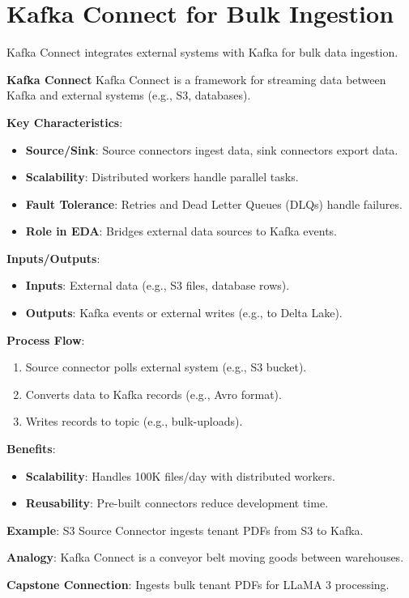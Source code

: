 \documentclass[11pt]{article}
\begin{document}
\section{Kafka Connect for Bulk Ingestion}
Kafka Connect integrates external systems with Kafka for bulk data ingestion.

\begin{glossaryterm}
\textbf{Kafka Connect}\newline
Kafka Connect is a framework for streaming data between Kafka and external systems (e.g., S3, databases).

\textbf{Key Characteristics}:
\begin{itemize}
    \item \textbf{Source/Sink}: Source connectors ingest data, sink connectors export data.
    \item \textbf{Scalability}: Distributed workers handle parallel tasks.
    \item \textbf{Fault Tolerance}: Retries and Dead Letter Queues (DLQs) handle failures.
    \item \textbf{Role in EDA}: Bridges external data sources to Kafka events.
\end{itemize}

\textbf{Inputs/Outputs}:
\begin{itemize}
    \item \textbf{Inputs}: External data (e.g., S3 files, database rows).
    \item \textbf{Outputs}: Kafka events or external writes (e.g., to Delta Lake).
\end{itemize}

\textbf{Process Flow}:
\begin{enumerate}
    \item Source connector polls external system (e.g., S3 bucket).
    \item Converts data to Kafka records (e.g., Avro format).
    \item Writes records to topic (e.g., bulk-uploads).
\end{enumerate}

\textbf{Benefits}:
\begin{itemize}
    \item \textbf{Scalability}: Handles 100K files/day with distributed workers.
    \item \textbf{Reusability}: Pre-built connectors reduce development time.
\end{itemize}

\textbf{Example}: S3 Source Connector ingests tenant PDFs from S3 to Kafka.

\textbf{Analogy}: Kafka Connect is a conveyor belt moving goods between warehouses.

\textbf{Capstone Connection}: Ingests bulk tenant PDFs for LLaMA 3 processing.
\end{glossaryterm}
\end{document}
